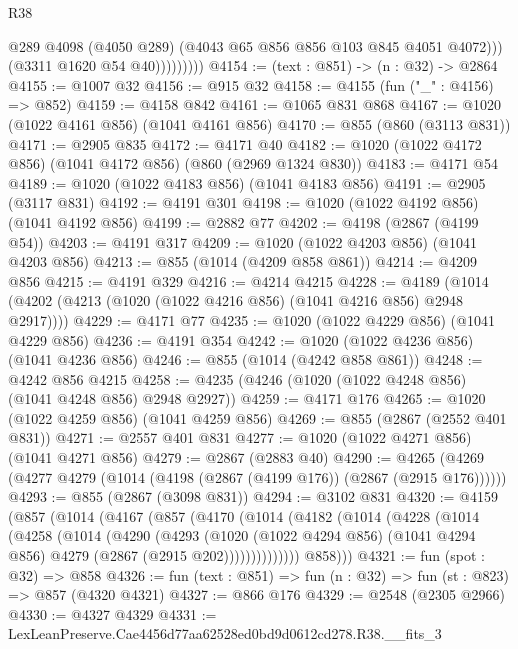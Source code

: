 \begin{lexlean}{R38}
\begin{coremodule}
                        @289
                        @4098
                        (@4050 @289)
                        (@4043 @65 @856 @856 @103 @845 @4051 @4072)))
                    (@3311 @1620 @54 @40)))))))))
@4154 := (text : @851) -> (n : @32) -> @2864
@4155 := @1007 @32
@4156 := @915 @32
@4158 := @4155 (fun ("_" : @4156) => @852)
@4159 := @4158 @842
@4161 := @1065 @831 @868
@4167 := @1020 (@1022 @4161 @856) (@1041 @4161 @856)
@4170 := @855 (@860 (@3113 @831))
@4171 := @2905 @835
@4172 := @4171 @40
@4182 := @1020 (@1022 @4172 @856) (@1041 @4172 @856) (@860 (@2969 @1324 @830))
@4183 := @4171 @54
@4189 := @1020 (@1022 @4183 @856) (@1041 @4183 @856)
@4191 := @2905 (@3117 @831)
@4192 := @4191 @301
@4198 := @1020 (@1022 @4192 @856) (@1041 @4192 @856)
@4199 := @2882 @77
@4202 := @4198 (@2867 (@4199 @54))
@4203 := @4191 @317
@4209 := @1020 (@1022 @4203 @856) (@1041 @4203 @856)
@4213 := @855 (@1014 (@4209 @858 @861))
@4214 := @4209 @856
@4215 := @4191 @329
@4216 := @4214 @4215
@4228 := @4189 (@1014 (@4202 (@4213 (@1020 (@1022 @4216 @856) (@1041 @4216 @856) @2948 @2917))))
@4229 := @4171 @77
@4235 := @1020 (@1022 @4229 @856) (@1041 @4229 @856)
@4236 := @4191 @354
@4242 := @1020 (@1022 @4236 @856) (@1041 @4236 @856)
@4246 := @855 (@1014 (@4242 @858 @861))
@4248 := @4242 @856 @4215
@4258 := @4235 (@4246 (@1020 (@1022 @4248 @856) (@1041 @4248 @856) @2948 @2927))
@4259 := @4171 @176
@4265 := @1020 (@1022 @4259 @856) (@1041 @4259 @856)
@4269 := @855 (@2867 (@2552 @401 @831))
@4271 := @2557 @401 @831
@4277 := @1020 (@1022 @4271 @856) (@1041 @4271 @856)
@4279 := @2867 (@2883 @40)
@4290 := @4265 (@4269 (@4277 @4279 (@1014 (@4198 (@2867 (@4199 @176)) (@2867 (@2915 @176))))))
@4293 := @855 (@2867 (@3098 @831))
@4294 := @3102 @831
@4320 := @4159
    (@857
      (@1014
        (@4167
          (@857
            (@4170
              (@1014
                (@4182
                  (@1014
                    (@4228
                      (@1014
                        (@4258
                          (@1014
                            (@4290
                              (@4293
                                (@1020
                                  (@1022 @4294 @856)
                                  (@1041 @4294 @856)
                                  @4279
                                  (@2867 (@2915 @202))))))))))))))
          @858)))
@4321 := fun (spot : @32) => @858
@4326 := fun (text : @851) => fun (n : @32) => fun (st : @823) => @857 (@4320 @4321)
@4327 := @866 @176
@4329 := @2548 (@2305 @2966)
@4330 := @4327 @4329
@4331 := LexLeanPreserve.Cae4456d77aa62528ed0bd9d0612cd278.R38.__fits_3

\end{coremodule}
\end{lexlean}
